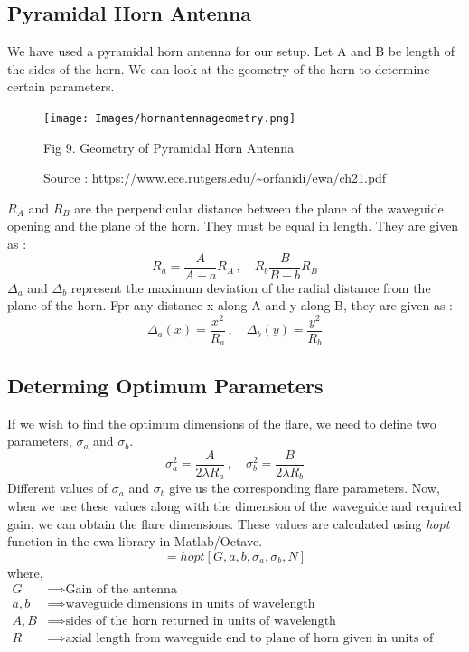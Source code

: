 \documentclass[12pt]{article}
\begin{document}
\subsection{Pyramidal Horn Antenna}
We have used a pyramidal horn antenna for our setup. \linebreak
Let A and B be length of the sides of the horn. We can look at the geometry of the horn to determine certain parameters.
\begin{figure}[H]
  \centering
  \texttt{[image: Images/hornantennageometry.png]}
  \caption{Fig 9. Geometry of Pyramidal Horn Antenna}
  \caption{\tiny Source : \url{https://www.ece.rutgers.edu/~orfanidi/ewa/ch21.pdf}}
\end{figure}
$R_A$ and $R_B$ are the perpendicular distance between the plane of the waveguide opening and the plane of the horn. They must be equal in length. They are given as :
\begin{equation}
  R_a = \dfrac{A}{A-a}R_A \, , \quad R_b \dfrac{B}{B-b}R_B \label{eq:22}
\end{equation}
$\Delta_a$ and $\Delta_b$ represent the maximum deviation of the radial distance from the plane of the horn. Fpr any distance x along A and y along B, they are given as :
\begin{equation}
  \Delta_a(x)=\dfrac{x^2}{R_a} \, , \quad \Delta_b(y)=\dfrac{y^2}{R_b} \label{eq:23}
\end{equation}
\subsection{Determing Optimum Parameters}
If we wish to find the optimum dimensions of the flare, we need to define two parameters, $\sigma_a$ and $\sigma_b$. 
\begin{equation}
  \sigma^2_a = \dfrac{A}{2\lambda R_a} \, , \quad \sigma^2_b = \dfrac{B}{2\lambda R_b} \label{eq:24}
\end{equation}
Different values of $\sigma_a$ and $\sigma_b$ give us the corresponding flare parameters. Now, when we use these values along with the dimension of the waveguide and required gain, we can obtain the flare dimensions. \linebreak
These values are calculated using \textit{hopt} function in the ewa library in Matlab/Octave.
\begin{equation*}
  [A, B , R, err]=hopt[G,a,b,\sigma_a,\sigma_b,N]
\end{equation*}
where,
\begin{align*}
  G & \implies \text{Gain of the antenna} \\
  a,b & \implies \text{waveguide dimensions in units of wavelength} \\
  A,B & \implies \text{sides of the horn returned in units of wavelength}\\
  R & \implies \text{axial length from waveguide end to plane of horn given in units of wavelength}
\end{align*}
\end{document}
